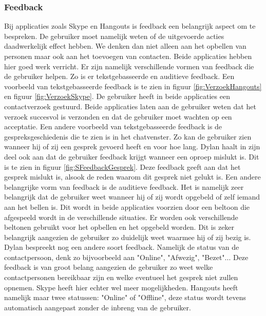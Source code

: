 \documentclass[11pt]{article}
\begin{document}
\subsubsection{Feedback}
Bij applicaties zoals Skype en Hangouts is feedback een belangrijk aspect om te bespreken. De gebruiker moet namelijk weten of de uitgevoerde acties daadwerkelijk effect hebben. We denken dan niet alleen aan het opbellen van personen maar ook aan het toevoegen van contacten. 
\newline
Beide applicaties hebben hier goed werk verricht. Er zijn namelijk verschillende vormen van feedback die de gebruiker helpen. Zo is er tekstgebasseerde en auditieve feedback.
\newline
Een voorbeeld van tekstgebasseerde feedback is te zien in figuur \ref{fig:VerzoekHangouts} en figuur \ref{fig:VerzoekSkype}. De gebruiker heeft in beide applicaties een contactverzoek gestuurd. Beide applicaties laten aan de gebruiker weten dat het verzoek succesvol is verzonden en dat de gebruiker moet wachten op een acceptatie. Een andere voorbeeld van tekstgebasseerde feedback is de gespreksgeschiedenis die te zien is in het chatvenster. Zo kan de gebruiker zien wanneer hij of zij een gesprek gevoerd heeft en voor hoe lang. Dylan haalt in zijn deel ook aan dat de gebruiker feedback krijgt wanneer een oproep mislukt is. Dit is te zien in figuur \ref{fig:SFeedbackGesprek}. Deze feedback geeft aan dat het gesprek mislukt is, alsook de reden waarom dit gesprek niet gelukt is.
\newline
Een andere belangrijke vorm van feedback is de auditieve feedback. Het is namelijk zeer belangrijk dat de gebruiker weet wanneer hij of zij wordt opgebeld of zelf iemand aan het bellen is. Dit wordt in beide applicaties voorzien door een beltoon die afgespeeld wordt in de verschillende situaties. Er worden ook verschillende beltonen gebruikt voor het opbellen en het opgebeld worden. Dit is zeker belangrijk aangezien de gebruiker zo duidelijk weet waarmee hij of zij bezig is. 
\newline
Dylan bespreekt nog een andere soort feedback. Namelijk de status van de contactpersoon, denk zo bijvoorbeeld aan "Online", "Afwezig", "Bezet"... Deze feedback is van groot belang aangezien de gebruiker zo weet welke contactpersonen bereikbaar zijn en welke eventueel het gesprek niet zullen opnemen. Skype heeft hier echter wel meer mogelijkheden. Hangouts heeft namelijk maar twee statussen: "Online" of "Offline", deze status wordt tevens automatisch aangepast zonder de inbreng van de gebruiker. 
\end{document}
